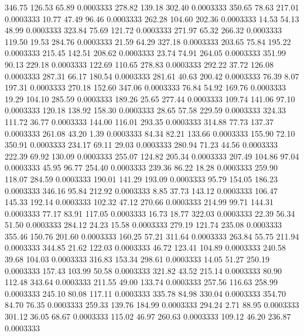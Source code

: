 346.75  126.53   65.89   0.0003333
 278.82  139.18  302.40   0.0003333
 350.65   78.63  217.01   0.0003333
  10.77   47.49   96.46   0.0003333
 262.28  104.60  202.36   0.0003333
  14.53   54.13   48.99   0.0003333
 323.84   75.69  121.72   0.0003333
 271.97   65.32  266.32   0.0003333
 119.50   19.53  284.76   0.0003333
  21.59   64.29  327.18   0.0003333
 203.65   75.84  195.22   0.0003333
 215.45  142.51  208.62   0.0003333
  23.74   74.91  264.05   0.0003333
 351.99   90.13  229.18   0.0003333
 122.69  110.65  278.83   0.0003333
 292.22   37.72  126.08   0.0003333
 287.31   66.17  180.54   0.0003333
 281.61   40.63  200.42   0.0003333
  76.39    8.07  197.31   0.0003333
 270.18  152.60  347.06   0.0003333
  76.84   54.92  169.76   0.0003333
  19.29  104.10  285.59   0.0003333
 189.26   25.65  277.44   0.0003333
 109.74  141.06   97.10   0.0003333
 120.18  138.92  158.30   0.0003333
  28.65   57.58  229.59   0.0003333
 324.33  111.72   36.77   0.0003333
 144.00  116.01  293.35   0.0003333
 314.88   77.73  137.37   0.0003333
 261.08   43.20    1.39   0.0003333
  84.34   82.21  133.66   0.0003333
 155.90   72.10  350.91   0.0003333
 234.17   69.11   29.03   0.0003333
 280.94   71.23   44.56   0.0003333
 222.39   69.92  130.09   0.0003333
 255.07  124.82  205.34   0.0003333
 207.49  104.86   97.04   0.0003333
  45.95   96.77  254.40   0.0003333
 239.36   86.22   18.28   0.0003333
 259.90  118.07  284.59   0.0003333
 190.01  141.29  193.09   0.0003333
  95.79  154.05  186.23   0.0003333
 346.16   95.84  212.92   0.0003333
   8.85   37.73  143.12   0.0003333
 106.47  145.33  192.14   0.0003333
 102.32   47.12  270.66   0.0003333
 214.99   99.71  144.31   0.0003333
  77.17   83.91  117.05   0.0003333
  16.73   18.77  322.03   0.0003333
  22.39   56.34   51.50   0.0003333
 284.12   24.23   15.58   0.0003333
 279.19  121.74  235.08   0.0003333
 355.46  150.76  201.60   0.0003333
 160.25   57.21  311.64   0.0003333
 263.84   55.75  211.94   0.0003333
 344.85   21.62  122.03   0.0003333
  46.72  123.41  104.89   0.0003333
 240.58   39.68  104.03   0.0003333
 316.83  153.34  298.61   0.0003333
  14.05   51.27  250.19   0.0003333
 157.43  103.99   50.58   0.0003333
 321.82   43.52  215.14   0.0003333
  80.90  112.48  343.64   0.0003333
 211.55   49.00  133.74   0.0003333
 257.56  116.63  258.99   0.0003333
 245.10   80.08  117.11   0.0003333
 335.78   84.98  330.04   0.0003333
 354.70   84.70   76.35   0.0003333
 259.33  139.76  184.99   0.0003333
 294.24    2.71   88.95   0.0003333
 301.12   36.05   68.67   0.0003333
 115.02   46.97  260.63   0.0003333
 109.12   46.20  236.87   0.0003333
